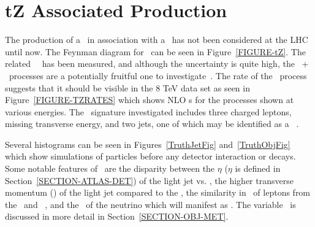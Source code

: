 \section{tZ Associated Production}
\label{SECTION-TZ}

The production of a \at~in association with a \az~has not been considered at the LHC until now. The Feynman diagram for \tz~can be seen in Figure~\ref{FIGURE-tZ}. The related \ttz~\xs~has been measured, and although the uncertainty is quite high, the \at~+ \az~processes are a potentially fruitful one to investigate~\cite{ATLAS-CONF-2016-003}. The rate of the \tz~process suggests that it should be visible in the 8 TeV data set as seen in Figure~\ref{FIGURE-TZRATES} which shows NLO \xs s for the processes shown at various energies. The \tz~signature investigated includes three charged leptons, missing transverse energy, and two jets, one of which may be identified as a \ab~\cite{Campbell:2013yla}. 

Several histograms can be seen in Figures~\ref{TruthJetFig} and~\ref{TruthObjFig} which show simulations of particles before any detector interaction or decays. Some notable features of \tz~are the disparity between the $\eta$ ($\eta$ is defined in Section~\ref{SECTION-ATLAS-DET}) of the light jet vs. \ab, the higher transverse momentum (\PT) of the light jet compared to the \ab, the similarity in \PT~of leptons from the \az~and \aw~, and the \PT~of the neutrino which will manifest as \met. The variable \met~is discussed in more detail in Section~\ref{SECTION-OBJ-MET}.






